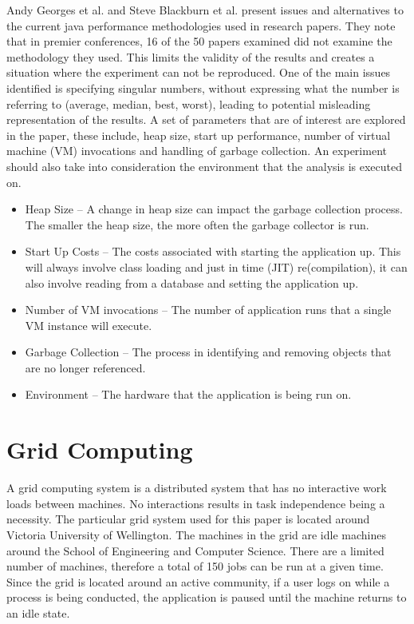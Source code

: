 Andy Georges et al. \cite{georges2007statistically} and Steve Blackburn et al. \cite{blackburn2008wake} present issues and alternatives to the current java performance methodologies used in research papers. They note that in premier conferences, 16 of the 50 papers examined did not examine the methodology they used. This limits the validity of the results and creates a situation where the experiment can not be reproduced. One of the main issues identified is specifying singular numbers, without expressing what the number is referring to (average, median, best, worst), leading to potential misleading representation of the results. A set of parameters that are of interest are explored in the paper, these include, heap size, start up performance, number of virtual machine (VM) invocations and handling of garbage collection. An experiment should also take into consideration the environment that the analysis is executed on.
\begin{itemize}
\item Heap Size -- A change in heap size can impact the garbage collection process. The smaller the heap size, the more often the garbage collector is run.
\item Start Up Costs  -- The costs associated with starting the application up. This will always involve class loading and just in time (JIT) re(compilation), it can also involve reading from a database and setting the application up.
\item Number of VM invocations -- The number of application runs that a single VM instance will execute.
\item Garbage Collection -- The process in identifying and removing objects that are no longer referenced.
\item Environment -- The hardware that the application is being run on.
\end{itemize}

\section{Grid Computing}
A grid computing system is a distributed system that has no interactive work loads between machines. No interactions results in task independence being a necessity. The particular grid system used for this paper is located around Victoria University of Wellington. The machines in the grid are idle machines around the School of Engineering and Computer Science. There are a limited number of machines, therefore a total of 150 jobs can be run at a given time. Since the grid is located around an active community, if a user logs on while a process is being conducted, the application is paused until the machine returns to an idle state.

